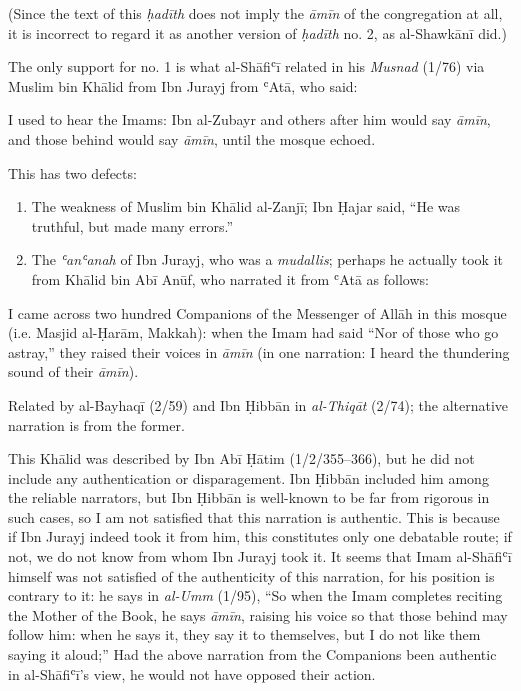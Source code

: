 (Since the text of this \emph{ḥadīth} does not imply the \emph{āmīn} of
the congregation at all, it is incorrect to regard it as another version
of \emph{ḥadīth} no. 2, as al-Shawkānī did.)

The only support for no. 1 is what al-Shāfiʿī related in his
\emph{Musnad} (1/76) via Muslim bin Khālid from Ibn Jurayj from ʿAtā,
who said:

\begin{mdframed}[style=narration, frametitle={Narration}]
I used to hear the Imams: Ibn al-Zubayr and others after him would say \textit{āmīn}, and those behind would say \textit{āmīn}, until the mosque echoed.
\end{mdframed}

This has two defects:

\begin{enumerate}
\def\labelenumi{\roman{enumi}.}
\tightlist
\item
  The weakness of Muslim bin Khālid al-Zanjī; Ibn Ḥajar said, ``He was
  truthful, but made many errors.''
\item
  The \emph{ʿanʿanah} of Ibn Jurayj, who was a \emph{mudallis}; perhaps
  he actually took it from Khālid bin Abī Anūf, who narrated it from
  ʿAtā as follows:
\end{enumerate}

\begin{mdframed}[style=narration, frametitle={Narration}]
I came across two hundred Companions of the Messenger of Allāh \pbuh in this mosque (i.e. Masjid al-Ḥarām, Makkah): when the Imam had said “Nor of those who go astray,” they raised their voices in \textit{āmīn} (in one narration: I heard the thundering sound of their \textit{āmīn}).
\end{mdframed}

Related by al-Bayhaqī (2/59) and Ibn Ḥibbān in \emph{al-Thiqāt} (2/74);
the alternative narration is from the former.

This Khālid was described by Ibn Abī Ḥātim (1/2/355--366), but he did
not include any authentication or disparagement. Ibn Ḥibbān included him
among the reliable narrators, but Ibn Ḥibbān is well-known to be far
from rigorous in such cases, so I am not satisfied that this narration
is authentic. This is because if Ibn Jurayj indeed took it from him,
this constitutes only one debatable route; if not, we do not know from
whom Ibn Jurayj took it. It seems that Imam al-Shāfiʿī himself was not
satisfied of the authenticity of this narration, for his position is
contrary to it: he says in \emph{al-Umm} (1/95), ``So when the Imam
completes reciting the Mother of the Book, he says \emph{āmīn}, raising
his voice so that those behind may follow him: when he says it, they say
it to themselves, but I do not like them saying it aloud;'' Had the
above narration from the Companions been authentic in al-Shāfiʿī's view,
he would not have opposed their action.

